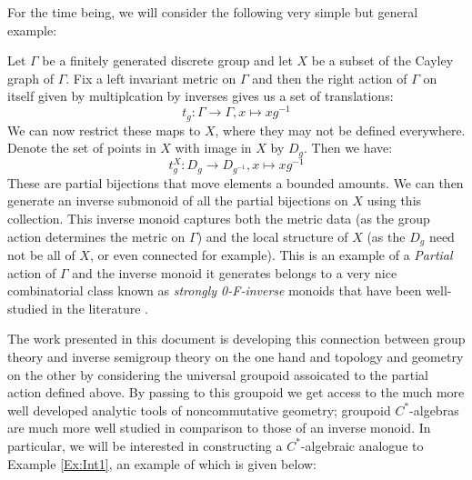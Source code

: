 For the time being, we will consider the following very simple but general example:
\begin{example}\label{Ex:Int1}
Let $\Gamma$ be a finitely generated discrete group and let $X$ be a subset of the Cayley graph of $\Gamma$. Fix a left invariant metric on $\Gamma$ and then the right action of $\Gamma$ on itself given by multiplcation by inverses gives us a set of translations:
\begin{equation*}
t_{g}: \Gamma \rightarrow \Gamma , x \mapsto xg^{-1}
\end{equation*}
We can now restrict these maps to $X$, where they may not be defined everywhere. Denote the set of points in $X$ with image in $X$ by $D_{g}$. Then we have:
\begin{equation*}
t_{g}^{X}: D_{g} \rightarrow D_{g^{-1}} , x \mapsto xg^{-1}
\end{equation*}
These are partial bijections that move elements a bounded amounts. We can then generate an inverse submonoid of all the partial bijections on $X$ using this collection. This inverse monoid captures both the metric data (as the group action determines the metric on $\Gamma$) and the local structure of $X$ (as the $D_{g}$ need not be all of $X$, or even connected for example). This is an example of a \textit{Partial} action of $\Gamma$ and the inverse monoid it generates belongs to a very nice combinatorial class known as \textit{strongly 0-F-inverse} monoids that have been well-studied in the literature \cite{MR1721768,MR1798993,Nor-2012}.
\end{example}

The work presented in this document is developing this connection between group theory and inverse semigroup theory on the one hand and topology and geometry on the other by considering the universal groupoid assoicated to the partial action defined above. By passing to this groupoid we get access to the much more well developed analytic tools of noncommutative geometry; groupoid $C^{*}$-algebras are much more well studied in comparison to those of an inverse monoid. In particular, we will be interested in constructing a $C^{*}$-algebraic analogue to Example \ref{Ex:Int1}, an example of which is given below:

